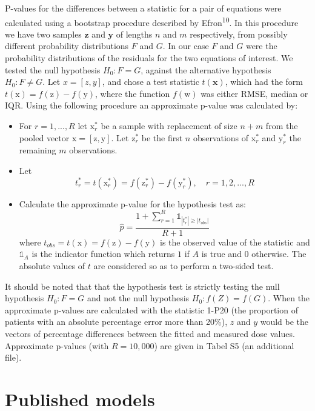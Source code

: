 \documentclass[11pt,]{article}
\begin{document}
P-values for the differences between a statistic for a pair of equations
were calculated using a bootstrap procedure described by
Efron\textsuperscript{10}. In this procedure we have two samples
\(\mathbf{z}\) and \(\mathbf{y}\) of lengths \(n\) and \(m\)
respectively, from possibly different probability distributions \(F\)
and \(G\). In our case \(F\) and \(G\) were the probability
distributions of the residuals for the two equations of interest. We
tested the null hypothesis \(H_0: F = G\), against the alternative
hypothesis \(H_0: F \neq G\). Let \(x = [z,y]\), and chose a test
statistic \(t(\mathbf{x})\), which had the form
\(t(\mathrm{x}) = f(\mathrm{z}) - f(\mathrm{y})\), where the function
\(f(\mathrm{w})\) was either RMSE, median or IQR. Using the following
procedure an approximate p-value was calculated by:

\begin{itemize}
\item For $r = 1, ..., R$ let $\mathrm{x}^*_r$ be a sample with replacement of size $n+m$ from the pooled vector $\mathrm{x} = [\mathrm{z}, \mathrm{y}]$. Let $\mathrm{z}^*_r$ be the first $n$ observations of  $\mathrm{x}^*_r$ and $\mathrm{y}^*_r$ the remaining $m$ observations.
\item Let 
$$t_r^* = t(\mathrm{x}^*_r) = f(\mathrm{z}^*_r) - f(\mathrm{y}^*_r), \quad r = 1, 2, ..., R$$
\item Calculate the approximate p-value for the hypothesis test as: 
$$ \widehat{p} =\frac{1 + \sum_{r=1}^R \mathbb{1}_{\left| t_r^*\right| \geq \left| t_{obs}\right|}}{R + 1}$$ 
where $t_{obs} = t(\mathrm{x}) = f(\mathrm{z}) - f(\mathrm{y})$ is the observed value of the statistic and $\mathbb{1}_A$ is the indicator function which returns $1$ if $A$ is true and $0$ otherwise. The absolute values of $t$ are considered so as to perform a two-sided test. 
\end{itemize}

It should be noted that that the hypothesis test is strictly testing the
null hypothesis \(H_0 :F=G\) and not the null hypothesis
\(H_0: f(Z) = f(G)\). When the approximate p-values are calculated with
the statistic 1-P20 (the proportion of patients with an absolute
percentage error more than 20\%), \(z\) and \(y\) would be the vectors
of percentage differences between the fitted and measured dose values.
Approximate p-values (with \(R = 10,000\)) are given in Tabel S5 (an
additional file).

\section{Published models}\label{published-models}
\end{document}
